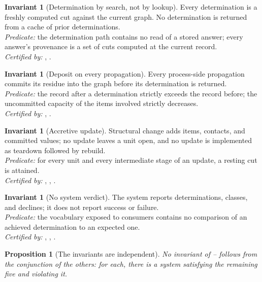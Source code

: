\documentclass[11pt,twocolumn,a4paper]{article}
\theoremstyle{dirthm}
\newtheorem{proposition}[theorem]{Proposition}
\theoremstyle{definition}
\newtheorem{binv}[theorem]{Invariant}
\theoremstyle{remark}
\begin{document}
\begin{binv}[Determination by search, not by lookup]
\label{binv:search}
Every determination is a freshly computed cut against the current graph. No
determination is returned from a cache of prior determinations.\\
\emph{Predicate:} the determination path contains no read of a stored answer;
every answer's provenance is a set of cuts computed at the current record.\\
\emph{Certified by:} , .
\end{binv}

\begin{binv}[Deposit on every propagation]
\label{binv:deposit}
Every process-side propagation commits its residue into the graph before its
determination is returned.\\
\emph{Predicate:} the record after a determination strictly exceeds the record
before; the uncommitted capacity of the items involved strictly decreases.\\
\emph{Certified by:} , .
\end{binv}

\begin{binv}[Accretive update]
\label{binv:accretive}
Structural change adds items, contacts, and committed values; no update leaves
a unit open, and no update is implemented as teardown followed by rebuild.\\
\emph{Predicate:} for every unit and every intermediate stage of an update, a
resting cut is attained.\\
\emph{Certified by:} , ,
.
\end{binv}

\begin{binv}[No system verdict]
\label{binv:no-verdict}
The system reports determinations, classes, and declines; it does not report
success or failure.\\
\emph{Predicate:} the vocabulary exposed to consumers contains no comparison
of an achieved determination to an expected one.\\
\emph{Certified by:} , ,
.
\end{binv}

\begin{proposition}[The invariants are independent]
\label{prop:invariants-independent}
No invariant of -- follows from the
conjunction of the others: for each, there is a system satisfying the
remaining five and violating it.
\end{proposition}
\end{document}
